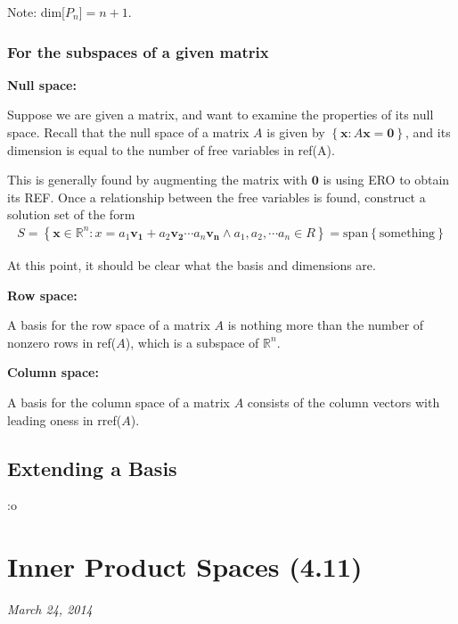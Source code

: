 \documentclass[a4paper,10pt]{report}
\begin{document}
Note: dim[$P_n$]$=n+1$.

\textbf{}

\subsubsection{For the subspaces of a given matrix}
\textbf{Null space:}

Suppose we are given a matrix, and want to examine the properties of its null space. Recall that the null space of a matrix $A$ is given by $\left\{ \mathbf{x}: A\mathbf{x} = \mathbf{0}\right\}$, and its dimension is equal to the number of free variables in ref(A).

This is generally found by augmenting the matrix with $\mathbf{0}$ is using ERO to obtain its REF. Once a relationship between the free variables is found, construct a solution set of the form
\begin{align*}
S = \left\{ \mathbf{x}\in \mathbb{R}^n : x = a_1\mathbf{v_1} + a_2\mathbf{v_2} \cdots a_n\mathbf{v_n} \land a_1,a_2,\cdots a_n \in R \right\} = \text{span}\left\{ \text{something}\right\}
\end{align*}

At this point, it should be clear what the basis and dimensions are.

\textbf{Row space:}

A basis for the row space of a matrix $A$ is nothing more than the number of nonzero rows in ref($A$), which is a subspace of $\mathbb{R}^n$.

\textbf{Column space:}

A basis for the column space of a matrix $A$ consists of the column vectors with leading oness in rref($A$).



\subsection{Extending a Basis}
:o

\section{Inner Product Spaces (4.11)}
\textit{March 24, 2014}\\
\end{document}
